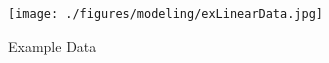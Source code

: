 \begin{figure}
\texttt{[image: ./figures/modeling/exLinearData.jpg]}
\centering
\caption{Example Data}
\label{fig:exLinearData}
\end{figure}
